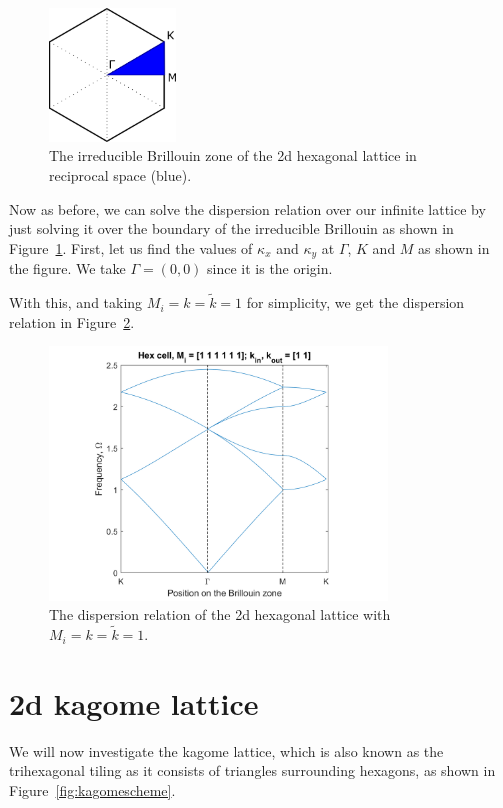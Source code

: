 \begin{figure}[!h]
\centering
\includegraphics[width=0.3\textwidth]{imgs/hexibz.png}
\caption{\label{fig:ibzonehex} The irreducible Brillouin zone of the 2d
    hexagonal lattice in reciprocal space (blue).}
\end{figure}

Now as before, we can solve the dispersion relation over our infinite lattice
by just solving it over the boundary of the irreducible Brillouin as shown in
Figure~\ref{fig:ibzonehex}. First, let us find the values of $\kappa_{x}$ and
$\kappa_{y}$ at $\Gamma$, $K$ and $M$ as shown in the figure. We take
$\Gamma=(0,0)$ since it is the origin. 

With this, and taking $M_i=k=\tilde{k}=1$ for simplicity, we get the dispersion
relation in Figure~\ref{fig:hexdisper}.

\begin{figure}[!h]
\centering
\includegraphics[width=0.8\textwidth]{imgs/hexdisper.png}
\caption{\label{fig:hexdisper} The dispersion relation of the 2d hexagonal
    lattice with $M_i=k=\tilde{k}=1$.}
\end{figure}


\section{2d kagome lattice}
We will now investigate the kagome lattice, which is also known as the
trihexagonal tiling as it consists of triangles surrounding hexagons, as shown
in Figure~\ref{fig:kagomescheme}.

